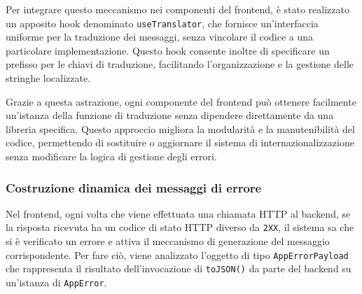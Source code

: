 Per integrare questo meccanismo nei componenti del frontend, è stato realizzato un apposito hook denominato \texttt{useTranslator}, che fornisce un'interfaccia uniforme per la traduzione dei messaggi, senza vincolare il codice a una particolare implementazione. Questo hook consente inoltre di specificare un prefisso per le chiavi di traduzione, facilitando l'organizzazione e la gestione delle stringhe localizzate.


%
Grazie a questa astrazione, ogni componente del frontend può ottenere facilmente un’istanza della funzione di traduzione senza dipendere direttamente da una libreria specifica. Questo approccio migliora la modularità e la manutenibilità del codice, permettendo di sostituire o aggiornare il sistema di internazionalizzazione senza modificare la logica di gestione degli errori.

\subsubsection{Costruzione dinamica dei messaggi di errore}
Nel frontend, ogni volta che viene effettuata una chiamata HTTP al backend, se la risposta ricevuta ha un codice di stato HTTP diverso da \texttt{2XX}, il sistema sa che si è verificato un errore e attiva il meccanismo di generazione del messaggio corrispondente. Per fare ciò, viene analizzato l’oggetto di tipo \texttt{AppErrorPayload} che rappresenta il risultato dell'invocazione di \texttt{toJSON()} da parte del backend su un'istanza di \texttt{AppError}.

